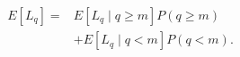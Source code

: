 \begin{equation}
    \begin{aligned}
    E\left[L_q\right]= & E\left[L_q \mid q \geq m\right] P(q \geq m) \\
    & +E\left[L_q \mid q<m\right] P(q<m) .
    \end{aligned}
\end{equation}